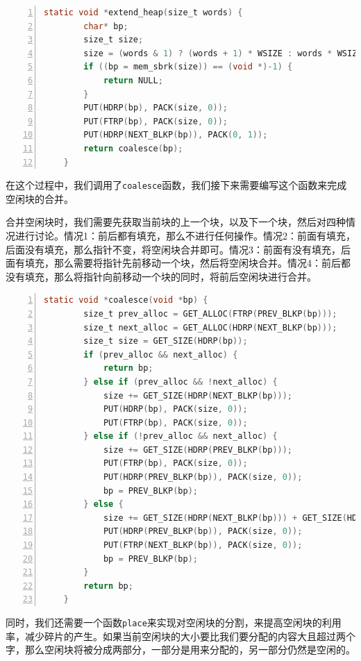 \documentclass{article}
\begin{document}
\begin{lstlisting}[xleftmargin = 4em,xrightmargin = 4em, aboveskip = 1em, numbers = left, language = C]
    static void *extend_heap(size_t words) {
        char* bp;
        size_t size;
        size = (words & 1) ? (words + 1) * WSIZE : words * WSIZE;
        if ((bp = mem_sbrk(size)) == (void *)-1) {
            return NULL;
        }
        PUT(HDRP(bp), PACK(size, 0));
        PUT(FTRP(bp), PACK(size, 0));
        PUT(HDRP(NEXT_BLKP(bp)), PACK(0, 1));
        return coalesce(bp);
    }
\end{lstlisting}

在这个过程中，我们调用了\texttt{coalesce}函数，我们接下来需要编写这个函数来完成空闲块的合并。

合并空闲块时，我们需要先获取当前块的上一个块，以及下一个块，然后对四种情况进行讨论。情况1：前后都有填充，那么不进行任何操作。情况2：前面有填充，后面没有填充，那么指针不变，将空闲块合并即可。情况3：前面有没有填充，后面有填充，那么需要将指针先前移动一个块，然后将空闲块合并。情况4：前后都没有填充，那么将指针向前移动一个块的同时，将前后空闲块进行合并。

\begin{lstlisting}[xleftmargin = 4em,xrightmargin = 3em, aboveskip = 1em, numbers = left, language = C]
    static void *coalesce(void *bp) {
        size_t prev_alloc = GET_ALLOC(FTRP(PREV_BLKP(bp)));
        size_t next_alloc = GET_ALLOC(HDRP(NEXT_BLKP(bp)));
        size_t size = GET_SIZE(HDRP(bp));
        if (prev_alloc && next_alloc) {
            return bp;
        } else if (prev_alloc && !next_alloc) {
            size += GET_SIZE(HDRP(NEXT_BLKP(bp)));
            PUT(HDRP(bp), PACK(size, 0));
            PUT(FTRP(bp), PACK(size, 0));
        } else if (!prev_alloc && next_alloc) {
            size += GET_SIZE(HDRP(PREV_BLKP(bp)));
            PUT(FTRP(bp), PACK(size, 0));
            PUT(HDRP(PREV_BLKP(bp)), PACK(size, 0));
            bp = PREV_BLKP(bp);
        } else {
            size += GET_SIZE(HDRP(NEXT_BLKP(bp))) + GET_SIZE(HDRP(PREV_BLKP(bp)));
            PUT(HDRP(PREV_BLKP(bp)), PACK(size, 0));
            PUT(FTRP(NEXT_BLKP(bp)), PACK(size, 0));
            bp = PREV_BLKP(bp);
        }
        return bp;
    }
\end{lstlisting}

同时，我们还需要一个函数\texttt{place}来实现对空闲块的分割，来提高空闲块的利用率，减少碎片的产生。如果当前空闲块的大小要比我们要分配的内容大且超过两个字，那么空闲块将被分成两部分，一部分是用来分配的，另一部分仍然是空闲的。
\end{document}

